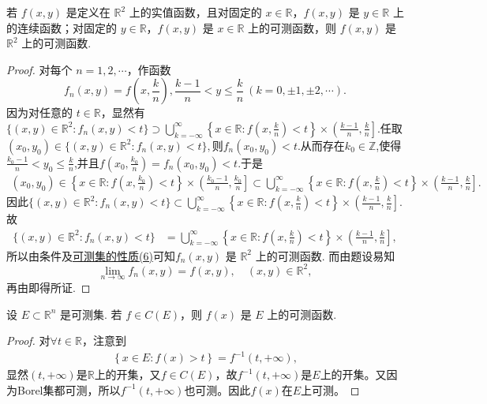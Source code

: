 \documentclass[../../main.tex]{subfiles}%
\begin{document}
\begin{proposition}
若 \(f(x,y)\) 是定义在 \(\mathbb{R}^2\) 上的实值函数，且对固定的 \(x \in \mathbb{R}\)，\(f(x,y)\) 是 \(y \in \mathbb{R}\) 上的连续函数；对固定的 \(y \in \mathbb{R}\)，\(f(x,y)\) 是 \(x \in \mathbb{R}\) 上的可测函数，则 \(f(x,y)\) 是 \(\mathbb{R}^2\) 上的可测函数.
\end{proposition}
\begin{proof}
对每个 \(n = 1,2,\cdots\)，作函数
\[
f_n(x,y) = f\left(x,\frac{k}{n}\right), \frac{k - 1}{n} < y \leqslant \frac{k}{n} \ (k = 0, \pm 1, \pm 2,\cdots).
\]
因为对任意的 \(t \in \mathbb{R}\)，显然有$\{(x,y) \in \mathbb{R}^2: f_n(x,y) < t\} 
\supset \bigcup_{k = -\infty}^{\infty}\left\{x \in \mathbb{R}: f\left(x,\frac{k}{n}\right) < t\right\} \times \left(\frac{k - 1}{n}, \frac{k}{n}\right].$任取$(x_0,y_0)\in \{(x,y) \in \mathbb{R}^2: f_n(x,y) < t\},$则$f_n(x_0,y_0)<t$.从而存在$k_0\in \mathbb{Z}$,使得$\frac{k_0-1}{n}<y_0 \leqslant  \frac{k}{n}$,并且$f(x_0,\frac{k_0}{n})=f_n(x_0,y_0)<t$.于是
\begin{align*}
(x_0,y_0)\in\left\{x \in \mathbb{R}: f\left(x,\frac{k_0}{n}\right) < t\right\} \times \left(\frac{k_0 - 1}{n}, \frac{k_0}{n}\right] \subset \bigcup_{k = -\infty}^{\infty}\left\{x \in \mathbb{R}: f\left(x,\frac{k}{n}\right) < t\right\} \times \left(\frac{k - 1}{n}, \frac{k}{n}\right].
\end{align*}
因此$\{(x,y) \in \mathbb{R}^2: f_n(x,y) < t\} 
\subset \bigcup_{k = -\infty}^{\infty}\left\{x \in \mathbb{R}: f\left(x,\frac{k}{n}\right) < t\right\} \times \left(\frac{k - 1}{n}, \frac{k}{n}\right].$
故
\begin{align*}
\{(x,y) \in \mathbb{R}^2: f_n(x,y) < t\} 
&= \bigcup_{k = -\infty}^{\infty}\left\{x \in \mathbb{R}: f\left(x,\frac{k}{n}\right) < t\right\} \times \left(\frac{k - 1}{n}, \frac{k}{n}\right],
\end{align*}
所以由条件及\hyperref[theorem:可测集的性质]{可测集的性质(6)}可知\(f_n(x,y)\) 是 \(\mathbb{R}^2\) 上的可测函数. 而由题设易知
\[
\lim_{n \to \infty}f_n(x,y) = f(x,y), \quad (x,y) \in \mathbb{R}^2,
\]
再由即得所证.
\end{proof}

\begin{proposition}[连续函数必可测]\label{proposition:连续函数必可测}
设 \(E \subset \mathbb{R}^n\) 是可测集. 若 \(f \in C(E)\)，则 \(f(x)\) 是 \(E\) 上的可测函数. 
\end{proposition}
\begin{proof}
对$\forall t\in \mathbb{R}$，注意到
\begin{align*}
\left\{ x\in E:f\left( x \right) >t \right\} =f^{-1}\left( t,+\infty \right) ,
\end{align*}
显然$\left( t,+\infty \right)$是$\mathbb{R}$上的开集，又$f\in C\left( E \right)$，故$f^{-1}\left( t,+\infty \right)$是$E$上的开集。又因为Borel集都可测，所以$f^{-1}\left( t,+\infty \right)$也可测。因此$f\left( x \right)$在$E$上可测。
\end{proof}
\end{document}
